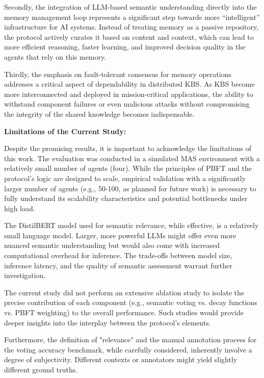 \documentclass[conference]{IEEEtran}
\begin{document}
Secondly, the integration of LLM-based semantic understanding directly into the memory management loop represents a significant step towards more “intelligent” infrastructure for AI systems. Instead of treating memory as a passive repository, the protocol actively curates it based on content and context, which can lead to more efficient reasoning, faster learning, and improved decision quality in the agents that rely on this memory.

Thirdly, the emphasis on fault-tolerant consensus for memory operations addresses a critical aspect of dependability in distributed KBS. As KBS become more interconnected and deployed in mission-critical applications, the ability to withstand component failures or even malicious attacks without compromising the integrity of the shared knowledge becomes indispensable.

\textbf{Limitations of the Current Study:}

Despite the promising results, it is important to acknowledge the limitations of this work. The evaluation was conducted in a simulated MAS environment with a relatively small number of agents (four). While the principles of PBFT and the protocol’s logic are designed to scale, empirical validation with a significantly larger number of agents (e.g., 50-100, as planned for future work) is necessary to fully understand its scalability characteristics and potential bottlenecks under high load.

The DistilBERT model used for semantic relevance, while effective, is a relatively small language model. Larger, more powerful LLMs might offer even more nuanced semantic understanding but would also come with increased computational overhead for inference. The trade-offs between model size, inference latency, and the quality of semantic assessment warrant further investigation.

The current study did not perform an extensive ablation study to isolate the precise contribution of each component (e.g., semantic voting vs. decay functions vs. PBFT weighting) to the overall performance. Such studies would provide deeper insights into the interplay between the protocol’s elements.

Furthermore, the definition of "relevance" and the manual annotation process for the voting accuracy benchmark, while carefully considered, inherently involve a degree of subjectivity. Different contexts or annotators might yield slightly different ground truths.
\end{document}
